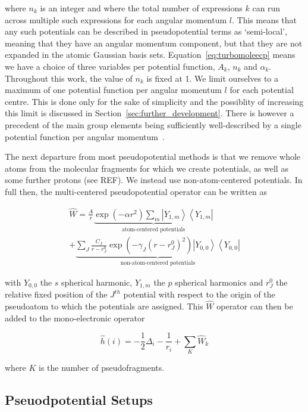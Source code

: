 \documentclass[aip,reprint,nofootinbib]{revtex4-1}
\begin{document}
where $n_k$ is an integer and where the total number of expressions $k$ can run across multiple such expressions for each angular momentum $l$. This means that any such potentials can be described in pseudopotential terms as `semi-local', meaning that they have an angular momentum component, but that they are not expanded in the atomic Gaussian basis sets. Equation~\ref{eq:turbomoleecp} means we have a choice of three variables per potential function, $A_k$, $n_k$ and $\alpha_k$. Throughout this work, the value of $n_k$ is fixed at 1. We limit ourselves to a maximum of one potential function per angular momentum $l$ for each potential centre. This is done only for the sake of simplicity and the possiblity of increasing this limit is discussed in Section~\ref{sec:further_development}. There is however a precedent of the main group elements being sufficiently well-described by a single potential function per angular momentum~\cite{igelmann_1988}.

The next departure from most pseudopotential methods is that we remove whole atoms from the molecular fragments for which we create potentials, as well as some further protons (see REF). We instead use non-atom-centered potentials. In full then, the multi-centered pseudopotential operator can be written as

\begin{multline}
\label{eq:ourPP}
\hat{W} = \frac{A}{r}
\underbrace{\exp(-\alpha r^2)\sum_m\left|Y_{1,m}\right>\left<Y_{1,m}\right|}_{\text{atom-centered potentials}}%
\\ +
\underbrace{\sum_J\frac{C_J}{r-r^{0}_J}\exp(-\gamma_J (r-r^0_J)^2)\left|Y_{0,0}\right>\left<Y_{0,0}\right|}_{\text{non-atom-centered potentials}}
\end{multline}

with $Y_{0,0}$ the $s$ spherical harmonic, $Y_{1,m}$ the $p$ spherical harmonics and $r^0_J$ the relative fixed position of the $J^{th}$ potential with respect to the origin of the pseudoatom to which the potentials are assigned. This $\hat{W}$ operator can then be added to the mono-electronic operator

\begin{equation}
\label{eq:monoElectronicOperator2}
\hat{h}(i) = -\frac{1}{2}\Delta_i - \frac{1}{r_i} + \sum_{K}{\hat{W}_k}
\end{equation}

where $K$ is the number of pseudofragments.

\subsection{Pseuodpotential Setups}
\end{document}
